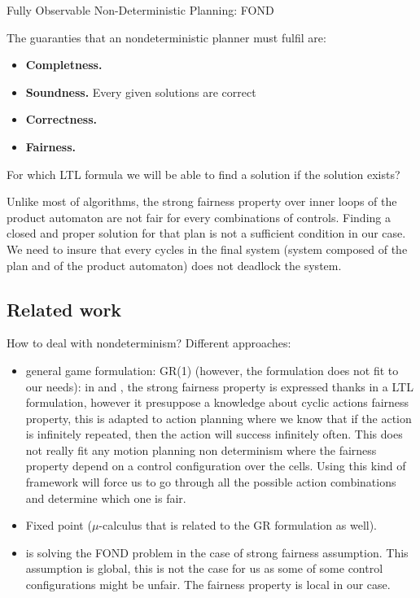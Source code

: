 Fully Observable Non-Deterministic Planning:  FOND

The guaranties that an nondeterministic planner must fulfil are:
\begin{itemize}[noitemsep,nolistsep]
\item \textbf{Completness.}
\item \textbf{Soundness.} Every given solutions are correct
\item \textbf{Correctness.} 
\item \textbf{Fairness.}
\end{itemize}

For which LTL formula we will be able to find a solution if the solution exists?

Unlike most of algorithms, the strong fairness property over inner loops of the product automaton are not fair for every combinations of controls.
Finding a closed and proper solution for that plan is not a sufficient condition in our case. 
We need to insure that every cycles in the final system (system composed of the plan and of the product automaton) does not deadlock the system.

\subsection{Related work}
How to deal with nondeterminism?
Different approaches:
\begin{itemize}
\item general game formulation: GR(1) (however, the formulation does not fit to our needs): in \cite{de2010generalized} and \cite{Kissmann2009}, the strong fairness property is expressed thanks in a LTL formulation, however it presuppose a knowledge about cyclic actions fairness property, this is adapted to action planning where we know that if the action is infinitely repeated, then the action will success infinitely often. This does not really fit any motion planning non determinism where the fairness property depend on a control configuration over the cells. Using this kind of framework will force us to go through all the possible action combinations and determine which one is fair.
\item Fixed point ($\mu$-calculus that is related to the GR formulation as well).
\item \cite{fu2011simple} is solving the FOND problem in the case of strong fairness assumption. This assumption is global, this is not the case for us as some of some control configurations might be unfair. The fairness property is local in our case.
\end{itemize}

